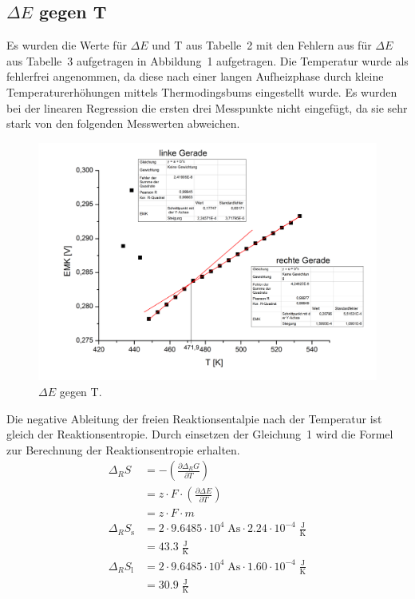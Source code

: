 \documentclass[12pt,a4paper,titlepage,headinclude,bibtotoc]{scrartcl}
\begin{document}
\subsection{$\Delta E$ gegen T}
Es wurden die Werte für $\Delta E$ und T aus Tabelle~2 mit den Fehlern aus für $\Delta E$ aus Tabelle~3 aufgetragen in Abbildung~1 aufgetragen. Die Temperatur wurde als fehlerfrei angenommen, da diese nach einer langen Aufheizphase durch kleine Temperaturerhöhungen mittels Thermodingsbums eingestellt wurde. Es wurden bei der linearen Regression die ersten drei Messpunkte nicht eingefügt, da sie sehr stark von den folgenden Messwerten abweichen. 
\begin{figure}[h]
\includegraphics[width=13.5cm]{EMK_gegen_T.png}
\caption{$\Delta E$ gegen T.}
\end{figure} 
\FloatBarrier
Die negative Ableitung der freien Reaktionsentalpie nach der Temperatur ist gleich der Reaktionsentropie. Durch einsetzen der Gleichung~1 wird die Formel zur Berechnung der Reaktionsentropie erhalten. 
\begin{align}
\Delta_R S &= -(\frac{\partial \Delta_R G}{\partial T})\\
&= z \cdot F \cdot (\frac{\partial \Delta E}{\partial T})\\
&= z \cdot F \cdot m \\
\Delta_R S_{\text{s}} &= 2 \cdot 9.6485 \cdot 10^4\;\text{As} \cdot 2.24 \cdot 10^{-4}\;\frac{\text{J}}{\text{K}}\\
&= 43.3\;\frac{\text{J}}{\text{K}}\\
\Delta_R  S_{\text{l}} &= 2 \cdot  9.6485 \cdot 10^4\;\text{As} \cdot 1.60 \cdot 10^{-4}\;\frac{\text{J}}{\text{K}}  \\
&= 30.9\;\frac{\text{J}}{\text{K}}
\end{align}
\end{document}
